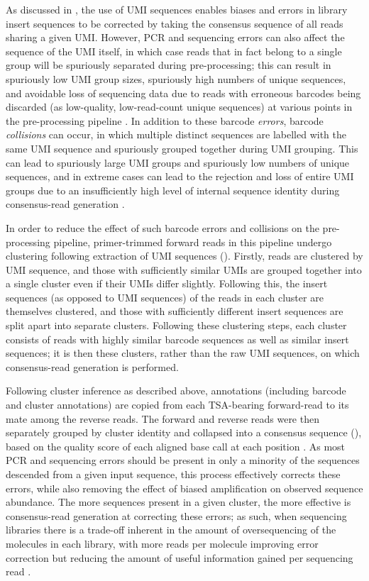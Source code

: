 As discussed in , the use of UMI sequences enables biases and errors in library insert sequences to be corrected by taking the consensus sequence of all reads sharing a given UMI. However, PCR and sequencing errors can also affect the sequence of the UMI itself, in which case reads that in fact belong to a single group will be spuriously separated during pre-processing; this can result in spuriously low UMI group sizes, spuriously high numbers of unique sequences, and avoidable loss of sequencing data due to reads with erroneous barcodes being discarded (as low-quality, low-read-count unique sequences) at various points in the pre-processing pipeline \parencite{shlemov2017igrec}. In addition to these barcode \textit{errors}, barcode \textit{collisions} can occur, in which multiple distinct sequences are labelled with the same UMI sequence and spuriously grouped together during UMI grouping. This can lead to spuriously large UMI groups and spuriously low numbers of unique sequences, and in extreme cases can lead to the rejection and loss of entire UMI groups due to an insufficiently high level of internal sequence identity during consensus-read generation \parencite{shlemov2017igrec}.

In order to reduce the effect of such barcode errors and collisions on the pre-processing pipeline, primer-trimmed forward reads in this pipeline undergo clustering following extraction of UMI sequences (). Firstly, reads are clustered by UMI sequence, and those with sufficiently similar UMIs are grouped together into a single cluster even if their UMIs differ slightly. Following this, the insert sequences (as opposed to UMI sequences) of the reads in each cluster are themselves clustered, and those with sufficiently different insert sequences are split apart into separate clusters. Following these clustering steps, each cluster consists of reads with highly similar barcode sequences as well as similar insert sequences; it is then these clusters, rather than the raw UMI sequences, on which consensus-read generation is performed.

Following cluster inference as described above, annotations (including barcode and cluster annotations) are copied from each TSA-bearing forward-read to its mate among the reverse reads. The forward and reverse reads were then separately grouped by cluster identity and collapsed into a consensus sequence (), based on the quality score of each aligned base call at each position \parencite{vanderheiden2014presto}. As most PCR and sequencing errors should be present in only a minority of the sequences descended from a given input sequence, this process effectively corrects these errors, while also removing the effect of biased amplification on observed sequence abundance. The more sequences present in a given cluster, the more effective is consensus-read generation at correcting these errors; as such, when sequencing \igseq libraries there is a trade-off inherent in the amount of oversequencing of the molecules in each library, with more reads per molecule improving error correction but reducing the amount of useful information gained per sequencing read \parencite{turchaninova2016igprep}.

